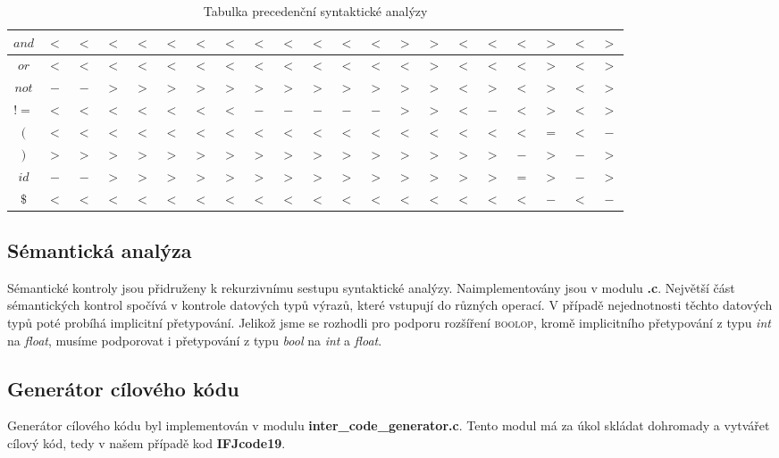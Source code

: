 \documentclass[12pt]{article}
\begin{document}
\begin{table}[!htbp]
\begin{tabular}{|c|c|c|c|c|c|c|c|c|c|c|c|c|c|c|c|c|c|c|c|c|}
    \hline
        $and$ & $<$ & $<$ & $<$ & $<$ & $<$ & $<$ & $<$ & $<$ & $<$ & $<$ & $<$ & $<$ & $>$ & $>$ & $<$ & $<$ & $<$ & $>$ & $<$ & $>$\\
    \hline
        $or$ & $<$ & $<$ & $<$ & $<$ & $<$ & $<$ & $<$ & $<$ & $<$ & $<$ & $<$ & $<$ & $<$ & $>$ & $<$ & $<$ & $<$ & $>$ & $<$ & $>$\\
    \hline
        $not$ & $-$ & $-$ & $>$ & $>$ & $>$ & $>$ & $>$ & $>$ & $>$ & $>$ & $>$ & $>$ & $>$ & $>$ & $<$ & $>$ & $<$ & $>$ & $<$ & $>$\\
    \hline
        $!=$ & $<$ & $<$ & $<$ & $<$ & $<$ & $<$ & $<$ & $-$ & $-$ & $-$ & $-$ & $-$ & $>$ & $>$ & $<$ & $-$ & $<$ & $>$ & $<$ & $>$\\
    \hline
        $($ & $<$ & $<$ & $<$ & $<$ & $<$ & $<$ & $<$ & $<$ & $<$ & $<$ & $<$ & $<$ & $<$ & $<$ & $<$ & $<$ & $<$ & $=$ & $<$ & $-$\\
    \hline
        $)$ & $>$ & $>$ & $>$ & $>$ & $>$ & $>$ & $>$ & $>$ & $>$ & $>$ & $>$ & $>$ & $>$ & $>$ & $>$ & $>$ & $-$ & $>$ & $-$ & $>$\\
    \hline
        $id$ & $-$ & $-$ & $>$ & $>$ & $>$ & $>$ & $>$ & $>$ & $>$ & $>$ & $>$ & $>$ & $>$ & $>$ & $>$ & $>$ & $=$ & $>$ & $-$ & $>$\\
    \hline
        $\$$ & $<$ & $<$ & $<$ & $<$ & $<$ & $<$ & $<$ & $<$ & $<$ & $<$ & $<$ & $<$ & $<$ & $<$ & $<$ & $<$ & $<$ & $-$ & $<$ & $-$\\
    \hline
    \end{tabular}
    \caption{Tabulka precedenční syntaktické analýzy}
    \label{tab:3}
\end{table}

\subsection{Sémantická analýza}
Sémantické kontroly jsou přidruženy k rekurzivnímu sestupu syntaktické analýzy.
Naimplementovány jsou v modulu \textbf{.c}. Největší část sémantických kontrol spočívá v kontrole datových typů výrazů, které vstupují do různých operací. V případě nejednotnosti těchto datových typů poté probíhá implicitní přetypování. Jelikož jsme se rozhodli pro podporu rozšíření \textsc{boolop}, kromě implicitního přetypování z typu \emph{int} na \emph{float}, musíme podporovat i přetypování z typu \emph{bool} na \emph{int} a \emph{float}.

\subsection{Generátor cílového kódu}
Generátor cílového kódu byl implementován v modulu \textbf{inter\_code\_generator.c}. Tento modul má za úkol skládat dohromady a vytvářet cílový kód, tedy v našem případě kod \textbf{IFJcode19}.
\end{document}

